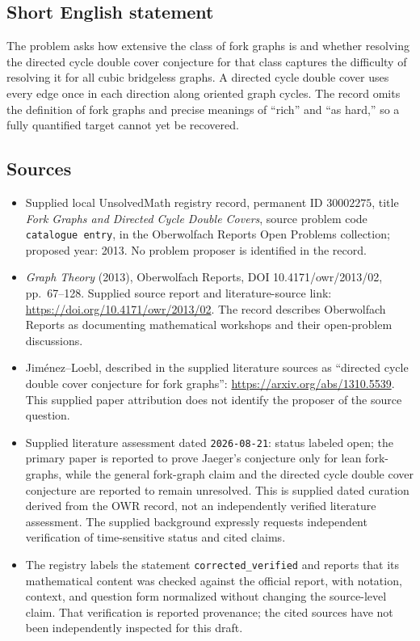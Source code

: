 \documentclass[11pt]{article}
\begin{document}
\subsection{Short English statement}
The problem asks how extensive the class of fork graphs is and whether resolving the directed cycle double cover conjecture for that class captures the difficulty of resolving it for all cubic bridgeless graphs. A directed cycle double cover uses every edge once in each direction along oriented graph cycles. The record omits the definition of fork graphs and precise meanings of ``rich'' and ``as hard,'' so a fully quantified target cannot yet be recovered.
\subsection{Sources}
\begin{itemize}
\item Supplied local UnsolvedMath registry record, permanent ID \(30002275\), title \emph{Fork Graphs and Directed Cycle Double Covers}, source problem code \texttt{catalogue entry}, in the Oberwolfach Reports Open Problems collection; proposed year: 2013. No problem proposer is identified in the record.
\item \emph{Graph Theory} (2013), Oberwolfach Reports, DOI 10.4171/owr/2013/02, pp.~67--128. Supplied source report and literature-source link: \url{https://doi.org/10.4171/owr/2013/02}. The record describes Oberwolfach Reports as documenting mathematical workshops and their open-problem discussions.
\item Jim\'{e}nez--Loebl, described in the supplied literature sources as ``directed cycle double cover conjecture for fork graphs'': \url{https://arxiv.org/abs/1310.5539}. This supplied paper attribution does not identify the proposer of the source question.
\item Supplied literature assessment dated \texttt{2026-08-21}: status labeled open; the primary paper is reported to prove Jaeger's conjecture only for lean fork-graphs, while the general fork-graph claim and the directed cycle double cover conjecture are reported to remain unresolved. This is supplied dated curation derived from the OWR record, not an independently verified literature assessment. The supplied background expressly requests independent verification of time-sensitive status and cited claims.
\item The registry labels the statement \texttt{corrected\_verified} and reports that its mathematical content was checked against the official report, with notation, context, and question form normalized without changing the source-level claim. That verification is reported provenance; the cited sources have not been independently inspected for this draft.
\end{itemize}
\end{document}
